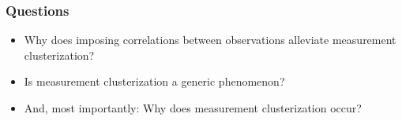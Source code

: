 \documentclass{beamer}
\begin{document}
\begin{frame}
\begin{columns}
\begin{column}{0.55\textwidth}
    \end{column}
  \end{columns}  
\end{frame}



\begin{frame}
\frametitle{Questions}
\begin{itemize}
\item Why does imposing correlations between observations alleviate
measurement clusterization?
%
\item Is measurement clusterization a generic phenomenon?
%
\item And, most importantly: Why does measurement clusterization occur?
\end{itemize}
\end{frame}
\end{document}
